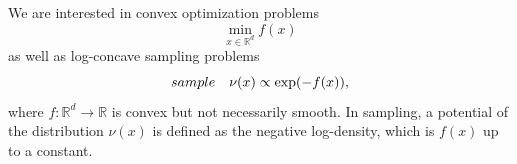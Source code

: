 \documentclass[11pt,letterpaper]{article}
\newcommand{\liang}{\color{red}}
\newcommand{\R}{\mathbb{R}}
\newcommand{\red}[1]{\textcolor{red}{#1}}
\begin{document}







We are interested in convex optimization problems
\begin{equation}\label{eq:opt}
	\min_{x \in \R^d} f(x)
\end{equation}
as well as log-concave sampling problems
\begin{equation}\label{eq:target}
       {\rm sample} \quad \nu(x) \propto \exp(-f(x)),
\end{equation} 
where $f: \R^d \to \R$ is convex but not necessarily smooth. In sampling, a potential of the distribution $\nu(x)$ is defined as the negative log-density, which is $f(x)$ up to a constant.
\end{document}
